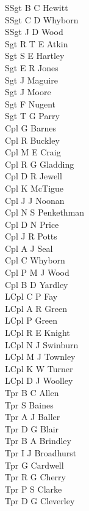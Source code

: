 \begin{multicols}{3}
  \small
  \noindent
  SSgt B C Hewitt \\
  SSgt C D Whyborn \\
  SSgt J D Wood \\
  Sgt R T E Atkin \\
  Sgt S E Hartley \\
  Sgt E R Jones \\
  Sgt J Maguire \\
  Sgt J Moore \\
  Sgt F Nugent \\
  Sgt T G Parry \\
  Cpl G Barnes \\
  Cpl R Buckley \\
  Cpl M E Craig \\
  Cpl R G Gladding \\
  Cpl D R Jewell \\
  Cpl K McTigue \\
  Cpl J J Noonan \\
  Cpl N S Penkethman \\
  Cpl D N Price \\
  Cpl J R Potts \\
  Cpl A J Seal \\
  Cpl C Whyborn \\
  Cpl P M J Wood \\
  Cpl B D Yardley \\
  LCpl C P Fay \\
  LCpl A R Green \\
  LCpl P Green \\
  LCpl R E Knight \\
  LCpl N J Swinburn \\
  LCpl M J Townley \\
  LCpl K W Turner \\
  LCpl D J Woolley \\
  Tpr B C Allen \\
  Tpr S Baines \\
  Tpr A J Baller \\
  Tpr D G Blair \\
  Tpr B A Brindley \\
  Tpr I J Broadhurst \\
  Tpr G Cardwell \\
  Tpr R G Cherry \\
  Tpr P S Clarke \\
  Tpr D G Cleverley \\

\end{multicols}
